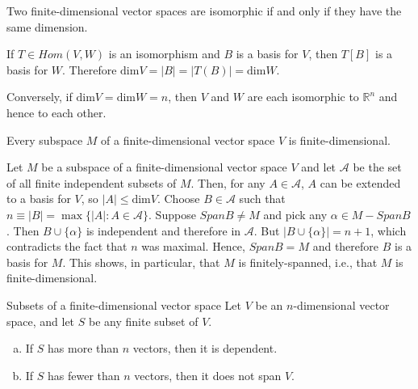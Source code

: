 \documentclass[12pt,letterpaper,reqno]{article}
\numberwithin{equation}{section}
\begin{document}
\begin{cor}
Two finite-dimensional vector spaces are isomorphic if and only if they have the same dimension.	
\end{cor}

\begin{pf}
If $T \in Hom(V,W)$ is an isomorphism and $B$ is a basis for $V$, then $T[B]$ is a basis for $W$. Therefore $\text{dim}V=|B|=|T(B)|=\text{dim}W$. 

Conversely, if $\text{dim} V = \text{dim} W=n$, then $V$ and $W$ are each isomorphic to $\mathbb{R}^n$ and hence to each other.	
\end{pf}

\begin{thm}
Every subspace $M$ of a finite-dimensional vector space $V$ is finite-dimensional.
\end{thm}

\begin{pf}
Let $M$ be a subspace of a finite-dimensional vector space $V$ and let $\mathscr{A}$ be the set of all finite independent subsets of $M$. Then, for any $A \in \mathscr{A}$, $A$ can be extended to a basis for $V$, so $|A| \leq \text{dim} V$. Choose $B \in \mathscr{A}$ such that $n\equiv|B|=\max \{|A|:A \in \mathscr{A}\}$. Suppose $Span B \neq M$ and pick any $\alpha \in M-SpanB$. Then $B \cup \{\alpha\}$ is independent and therefore in $\mathscr{A}$. But $|B \cup \{\alpha\}|=n+1$, which contradicts the fact that $n$ was maximal. Hence, $Span B=M$ and therefore $B$ is a basis for $M$. This shows, in particular, that $M$ is finitely-spanned, i.e., that $M$ is finite-dimensional.	
\end{pf}

\begin{thm}{Subsets of a finite-dimensional vector space}\label{thm:subsets_of_a_finite-dimensional_vector_space}
	Let $V$ be an $n$-dimensional vector space, and let $S$ be any finite subset of $V$.
	\begin{enumerate}[(a)]
		\item If $S$ has more than $n$ vectors, then it is dependent.
		\item If $S$ has fewer than $n$ vectors, then it does not span $V$.
	\end{enumerate}
\end{thm}
\end{document}
